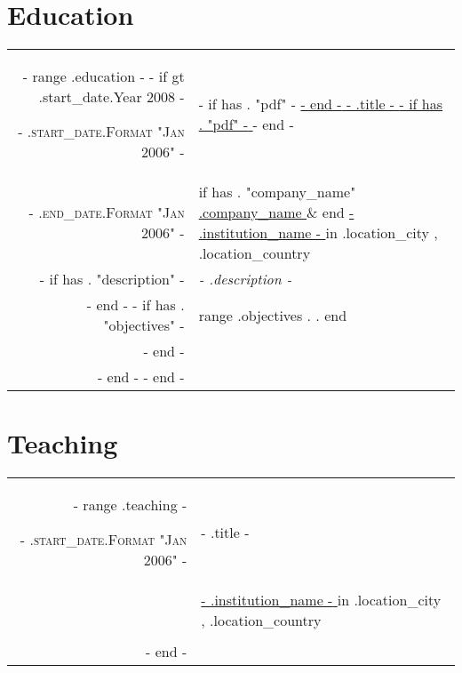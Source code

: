 \section{Education}
\begin{tabular}{r|p{15cm}}
    {{- range .education -}}
    {{- if gt .start_date.Year 2008 -}}

    \textsc{ {{- .start_date.Format "Jan 2006" -}} } & {{- if has . "pdf" -}} \href{ {{- .pdf -}} }{ {{- end -}} {{- .title -}} {{- if has . "pdf" -}} } {{- end -}}                                                                                                     \\
    \textsc{ {{- .end_date.Format "Jan 2006" -}} }   & {{ if has . "company_name" }} \href{ {{- .company_url -}} } { {{ .company_name }} } \& {{ end }} \href{ {{- .institution_url -}} } { {{- .institution_name -}} } in {{ .location_city }}, {{ .location_country }} \\
    {{- if has . "description" -}}                   & \emph{ {{- .description -}} }                                                                                                                                                                                     \\ {{- end -}}
    {{- if has . "objectives" -}}                    & \footnotesize{ {{ range .objectives }} {{ . }}. {{ end }} }                                                                                                                                                       \\ {{- end -}}
    \multicolumn{2}{c}{}                                                                                                                                                                                                                                                 \\

    {{- end -}}
    {{- end -}}
\end{tabular}

\section{Teaching}
\begin{tabular}{r|p{15cm}}
    {{- range .teaching -}}

    \textsc{ {{- .start_date.Format "Jan 2006" -}} } & {{- .title -}}                                                                                                  \\
                                                     & \href{ {{- .institution_url -}} }{ {{- .institution_name -}} } in {{ .location_city }}, {{ .location_country }} \\
    \multicolumn{2}{c}{}                                                                                                                                               \\

    {{- end -}}
\end{tabular}


